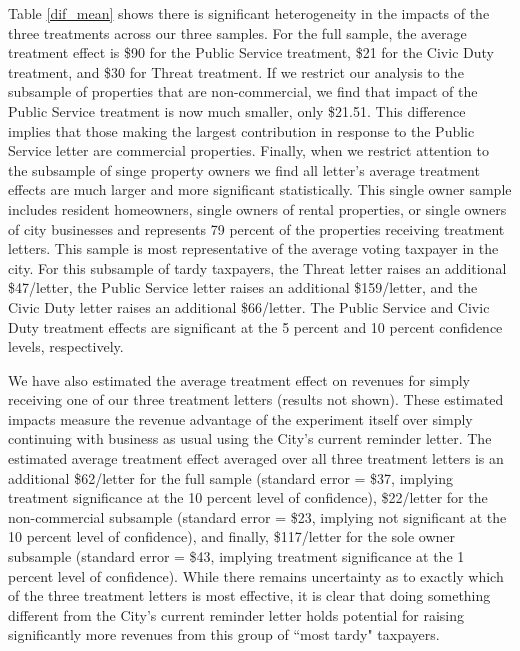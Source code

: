 \documentclass[12pt,titlepage]{article}
\begin{document}
Table \ref{dif_mean} shows there is significant heterogeneity in the impacts
of the three treatments across our three samples.  For the full
sample, the average treatment effect is \$90 for the Public Service
treatment, \$21 for the Civic Duty treatment, and \$30 for Threat
treatment.  If we restrict our analysis to the subsample of properties
that are non-commercial, we find that impact of the Public Service
treatment is now much smaller, only \$21.51.  This difference implies
that those making the largest contribution in response to the Public
Service letter are commercial properties.  Finally, when we restrict
attention to the subsample of singe property owners we find all
letter's average treatment effects are much larger and more
significant statistically.  This single owner sample includes resident
homeowners, single owners of rental properties, or single owners of
city businesses and represents 79 percent of the properties receiving
treatment letters.  This sample is most representative of the average
voting taxpayer in the city.  For this subsample of tardy taxpayers,
the Threat letter raises an additional \$47/letter, the Public Service
letter raises an additional \$159/letter, and the Civic Duty letter
raises an additional \$66/letter. The Public Service and Civic Duty
treatment effects are significant at the 5 percent and 10 percent
confidence levels, respectively.

We have also estimated the average treatment effect on revenues for simply 
receiving one of our three treatment letters (results not shown).   
These estimated impacts measure the revenue advantage of the 
experiment itself over simply continuing with business as usual 
using the City's current reminder letter.  The estimated average 
treatment effect averaged over all three treatment letters is an 
additional \$62/letter for the full sample (standard error = \$37, 
implying treatment significance at the 10 percent level of confidence), 
\$22/letter for the non-commercial subsample (standard error = \$23, 
implying not significant at the 10 percent level of confidence), 
and finally, \$117/letter for the sole owner subsample (standard 
error = \$43, implying treatment significance at the 1 percent 
level of confidence).  While there remains uncertainty as to 
exactly which of the three treatment letters is most effective, 
it is clear that doing something different from the City's current 
reminder letter holds potential for raising significantly more 
revenues from this group of ``most tardy" taxpayers.  
\end{document}

